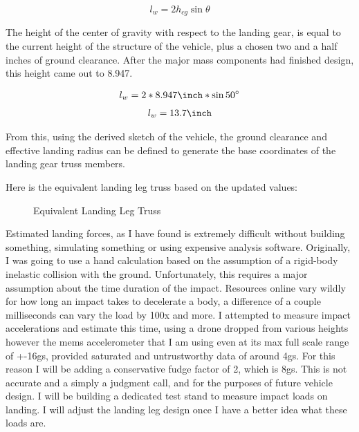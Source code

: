 \documentclass[12pt,letterpaper]{article}
\begin{document}
\begin{equation}
    l_w = 2 h_{cg} \sin{\theta}
\end{equation}

The height of the center of gravity with respect to the landing gear, is equal to the current height of the structure of the vehicle, plus a chosen two and a half inches of ground clearance. After the major mass components had finished design, this height came out to 8.947\unit{\inch}.

\begin{gather*}
    \centering
    l_w = 2 * 8.947\unit{\inch} * \sin{50^\circ}
\end{gather*}
\begin{gather*}
    \centering
    l_w = 13.7\unit{\inch}
\end{gather*}

From this, using the derived sketch of the vehicle, the ground clearance and effective landing radius can be defined to generate the base coordinates of the landing gear truss members.

Here is the equivalent landing leg truss based on the updated values:


\begin{figure}[h!]
\centering
\caption{Equivalent Landing Leg Truss}
\end{figure}


Estimated landing forces, as I have found is extremely difficult without building something, simulating something or using expensive analysis software. Originally, I was going to use a hand calculation based on the assumption of a rigid-body inelastic collision with the ground. Unfortunately, this requires a major assumption about the time duration of the impact. Resources online vary wildly for how long an impact takes to decelerate a body, a difference of a couple milliseconds can vary the load by 100x and more. I attempted to measure impact accelerations and estimate this time, using a drone dropped from various heights however the mems accelerometer that I am using even at its max full scale range of +-16gs, provided saturated and untrustworthy data of around 4gs. For this reason I will be adding a conservative fudge factor of 2, which is 8gs. This is not accurate and a simply a judgment call, and for the purposes of future vehicle design. I will be building a dedicated test stand to measure impact loads on landing. I will adjust the landing leg design once I have a better idea what these loads are. 
\end{document}
